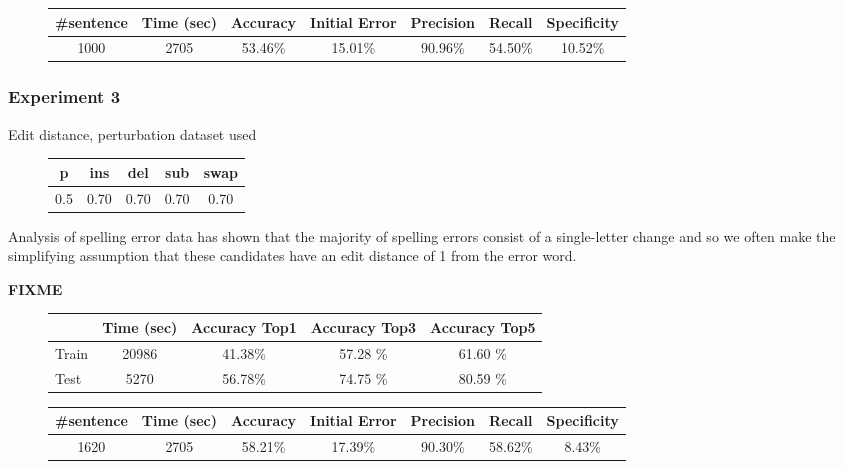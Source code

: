 \begin{figure}[H]
	\centering
	\begin{tabular}{ccccccc}
		\toprule
		\#sentence & Time (sec)  & Accuracy & Initial Error  &  Precision & Recall & Specificity \\
		\midrule
		\num{1000}	& \num{2705}  & \num{53,46}\%  & \num{15,01}\% & \num{90,96}\% & \num{54,50}\%  & 
		\num{10,52}\%  
		\\
		\bottomrule
	\end{tabular}
	\label{tab:sentence-eval2}
\end{figure}

\subsubsection{Experiment 3}

Edit distance, perturbation dataset used

\begin{figure}[H]
	\centering
	\begin{tabular}{ccccc}
		\toprule
		p 				 & ins 				 	& del  				&  sub 			   &   swap\\ \midrule
		\num{0.5} & \num{0,70} & \num{0,70}  & \num{0,70} & \num{0,70}\\
		\bottomrule
	\end{tabular}
	\label{tab:error_model3}
\end{figure}

Analysis of spelling error data has shown that the majority of spelling errors consist of a single-letter change and 
so we often make the simplifying assumption that these candidates have an edit distance of 1 from the error word.

\textbf{FIXME}
\begin{figure}[H]
	\centering
	\begin{tabular}{lcccc}
		\toprule
		& Time (sec)  & Accuracy Top1 & Accuracy Top3  &  Accuracy Top5 \\
		\midrule
		Train & \num{20986} & \num{41,38}\%  & \num{57,28} \% & \num{61,60} \% \\
		Test &	\num{5270}  & \num{56,78}\%  & \num{74,75} \% & \num{80,59} \%  \\
		\bottomrule
	\end{tabular}
	\label{tab:typo-eval3}
\end{figure}


\begin{figure}[H]
	\centering
	\begin{tabular}{ccccccc}
		\toprule
		\#sentence & Time (sec)  & Accuracy & Initial Error  &  Precision & Recall & Specificity \\
		\midrule
		\num{1620}	& \num{2705}  & \num{58,21}\%  & \num{17,39}\% & \num{90,30}\% & \num{58,62}\%  & 
		\num{8,43}\%  
		\\
		\bottomrule
	\end{tabular}
	\label{tab:sentence-eval3}
\end{figure}
